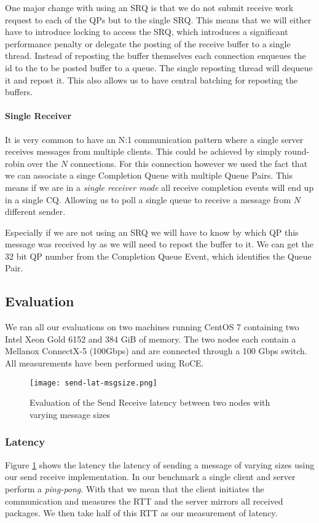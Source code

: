 One major change with using an SRQ is that we do not submit receive work request to each of the QPs but to the single SRQ. This
means that we will either have to introduce locking to access the SRQ, which introduces a significant performance penalty or 
delegate the posting of the receive buffer to a single thread. Instead of reposting the buffer themselves each connection 
enqueues the id to the to be posted buffer to a queue. The single reposting thread will dequeue it and repost it. This also
allows us to have central batching for reposting the buffers.

\paragraph{Single Receiver} It is very common to have an N:1 communication pattern where a single server receives messages 
from multiple clients. This could be achieved by simply round-robin over the $N$ connections. For this connection however 
we used the fact that we can associate a singe Completion Queue with multiple Queue Pairs. This means if we are in a
\emph{single receiver mode} all receive completion events will end up in a single CQ. Allowing us to poll a single queue to
receive a message from $N$ different sender.

Especially if we are not using an SRQ we will have to know by which QP this message was received by as we will need to repost
the buffer to it. We can get the 32 bit QP number from the Completion Queue Event, which identifies the Queue Pair. 


\subsection{Evaluation} \label{conn:send:eval}

We ran all our evaluations on two machines running CentOS 7 containing two Intel Xeon Gold 6152 and 384 GiB of memory.
The two nodes each contain a Mellanox ConnectX-5 (100Gbps) and are connected through a 100 Gbps switch. All measurements
have been performed using RoCE.


\begin{figure}[h]
\texttt{[image: send-lat-msgsize.png]}
\caption{Evaluation of the Send Receive latency between two nodes with varying message sizes}
\label{fig:plot-sndrcv-lat}
\end{figure}

\subsubsection{Latency} 
Figure \ref{fig:plot-sndrcv-lat} shows the latency the latency of sending a message of varying sizes using
our send receive implementation. In our benchmark a single client and server perform a \emph{ping-pong}. With that 
we mean that the client initiates the communication and measures the RTT and the server mirrors all received packages. 
We then take half of this RTT as our measurement of latency.

